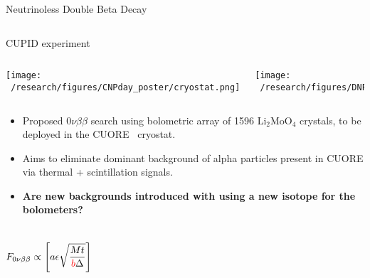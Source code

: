\documentclass[final]{beamer}
\newlength{\colwidth}
\begin{document}
\begin{frame}[t]
\begin{columns}[t]
\begin{column}{\colwidth}
\begin{block}{Neutrinoless Double Beta Decay}
\begin{columns}[c]
    \end{columns}
  \end{block}

  \begin{block}{CUPID experiment}
    \vspace{2cm}
    \begin{columns}[c] %
      
      \column{.4\colwidth} %
      \texttt{[image: ~/research/figures/CNPday\_poster/cryostat.png]}
      
      \column{.5\colwidth} %
      \texttt{[image: ~/research/figures/DNP2021/scintillation.png]}
      
    \end{columns}

    \begin{itemize}
      \item Proposed $0\nu\beta\beta$ search using bolometric array of 1596 Li$_2$MoO$_4$ crystals, to be deployed in the CUORE \ cryostat\footnotemark .
      \item Aims to eliminate dominant background of alpha particles present in CUORE via thermal + scintillation signals.
      \item \textbf{Are new backgrounds introduced with using a new isotope for the bolometers?}
    \end{itemize}


    \begin{columns}[c] %
      
      \column{.4\colwidth} %
        \begin{eqnarray*}
        F_{0\nu\beta\beta} \propto  \left[ a\epsilon \sqrt{\frac{Mt}{\textcolor{red}{b}\Delta}}\right]
        \end{eqnarray*}      
      

\end{columns}
\end{block}
\end{column}
\end{columns}
\end{frame}
\end{document}
